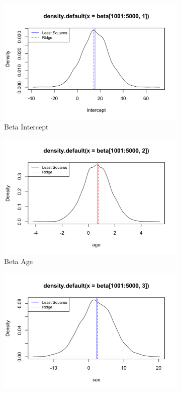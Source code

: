\documentclass[twoside]{article}
\begin{document}
\begin{figure}[H]
	\begin{center}
		\begin{subfigure}[h]{0.45\linewidth}
			\includegraphics[width=\linewidth]{Section2R/Figures/P2_12_Int.png}
			\caption{Beta Intercept}
		\end{subfigure}
		\begin{subfigure}[h]{0.45\linewidth}
			\includegraphics[width=\linewidth]{Section2R/Figures/P2_12_Age.png}
			\caption{Beta Age}
		\end{subfigure}
		\begin{subfigure}[h]{0.45\linewidth}
			\includegraphics[width=\linewidth]{Section2R/Figures/P2_12_Sex.png}

\end{subfigure}
\end{center}
\end{figure}
\end{document}
